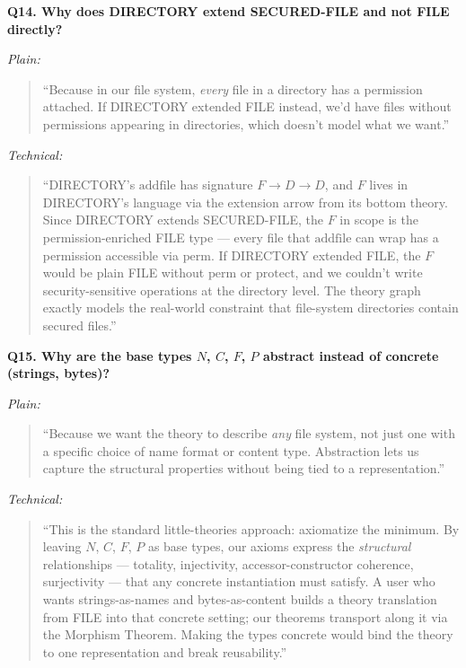 \documentclass[12pt]{article}
\newenvironment{say}{%
  \par\medskip%
  \begin{quote}%
  \setlength{\parskip}{0.7em}%
  \large\itshape%
}{%
  \end{quote}%
  \medskip%
}
\begin{document}
\vspace{0.8em}
\textbf{\color{slidebar}Q14. Why does DIRECTORY extend SECURED-FILE and not FILE directly?}

\textit{\color{pauseclr}Plain:}
\begin{say}
``Because in our file system, \emph{every} file in a directory has a permission attached. If DIRECTORY extended FILE instead, we'd have files without permissions appearing in directories, which doesn't model what we want.''
\end{say}

\textit{\color{pauseclr}Technical:}
\begin{say}
``DIRECTORY's $\mathrm{addfile}$ has signature $F \to D \to D$, and $F$ lives in DIRECTORY's language via the extension arrow from its bottom theory. Since DIRECTORY extends SECURED-FILE, the $F$ in scope is the permission-enriched FILE type --- every file that $\mathrm{addfile}$ can wrap has a permission accessible via $\mathrm{perm}$. If DIRECTORY extended FILE, the $F$ would be plain FILE without $\mathrm{perm}$ or $\mathrm{protect}$, and we couldn't write security-sensitive operations at the directory level. The theory graph exactly models the real-world constraint that file-system directories contain secured files.''
\end{say}

\vspace{0.8em}
\textbf{\color{slidebar}Q15. Why are the base types $N$, $C$, $F$, $P$ abstract instead of concrete (strings, bytes)?}

\textit{\color{pauseclr}Plain:}
\begin{say}
``Because we want the theory to describe \emph{any} file system, not just one with a specific choice of name format or content type. Abstraction lets us capture the structural properties without being tied to a representation.''
\end{say}

\textit{\color{pauseclr}Technical:}
\begin{say}
``This is the standard little-theories approach: axiomatize the minimum. By leaving $N$, $C$, $F$, $P$ as base types, our axioms express the \emph{structural} relationships --- totality, injectivity, accessor-constructor coherence, surjectivity --- that any concrete instantiation must satisfy. A user who wants strings-as-names and bytes-as-content builds a theory translation from FILE into that concrete setting; our theorems transport along it via the Morphism Theorem. Making the types concrete would bind the theory to one representation and break reusability.''
\end{say}
\end{document}
